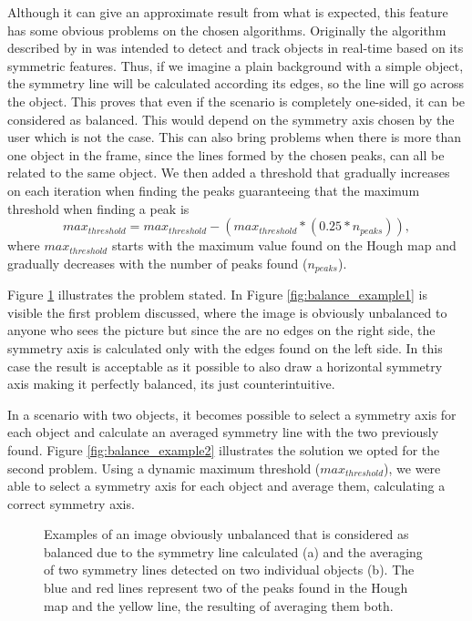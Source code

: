 Although it can give an approximate result from what is expected, this feature has some obvious problems on the chosen algorithms. Originally the algorithm described by \citeauthor{li2006real} in \cite{li2006real} was intended to detect and track objects in real-time based on its symmetric features. Thus, if we imagine a plain background with a simple object, the symmetry line will be calculated according its edges, so the line will go across the object. This proves that even if the scenario is completely one-sided, it can be considered as balanced. This would depend on the symmetry axis chosen by the user which is not the case.
This can also bring problems when there is more than one object in the frame, since the lines formed by the chosen peaks, can all be related to the same object. We then added a threshold that gradually increases on each iteration when finding the peaks guaranteeing that the maximum threshold when finding a peak is 
\begin{equation}
	max_{threshold} = max_{threshold} - (max_{threshold}*(0.25*n_{peaks})),
\end{equation}
where $max_{threshold}$ starts with the maximum value found on the Hough map and gradually decreases with the number of peaks found ($n_{peaks}$).

Figure \ref{fig:image_balance_example} illustrates the problem stated. In Figure \ref{fig:balance_example1} is visible the first problem discussed, where the image is obviously unbalanced to anyone who sees the picture but since the are no edges on the right side, the symmetry axis is calculated only with the edges found on the left side. In this case the result is acceptable as it possible to also draw a horizontal symmetry axis making it perfectly balanced, its just counterintuitive. 

In a scenario with two objects, it becomes possible to select a symmetry axis for each object and calculate an averaged symmetry line with the two previously found. Figure \ref{fig:balance_example2} illustrates the solution we opted for the second problem. Using a dynamic maximum threshold ($max_{threshold}$), we were able to select a symmetry axis for each object and average them, calculating a correct symmetry axis.

\begin{figure}[htbp]
	\centering
    \caption{Examples of an image obviously unbalanced that is considered as balanced due to the symmetry line calculated (a) and the averaging of two symmetry lines detected on two individual objects (b). The blue and red lines represent two of the peaks found in the Hough map and the yellow line, the resulting of averaging them both.}
    \label{fig:image_balance_example}
\end{figure}

